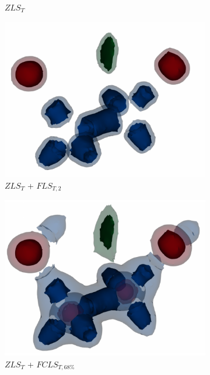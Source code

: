 \begin{figure}[t]
\begin{subfigure}{0.495\linewidth}
\caption{$ZLS_{T}$}
\label{}
\end{subfigure}
\begin{subfigure}{0.495\linewidth}
\centering
\includegraphics[width=\linewidth]{Images/EthaneDiol/fls_2.pdf}
\caption{$ZLS_{T}$ + $FLS_{T,2}$}
\label{}
\end{subfigure}
\begin{subfigure}{0.495\linewidth}
\centering
\includegraphics[width=\linewidth]{Images/EthaneDiol/fcls_68.pdf}
\caption{$ZLS_{T}$ + $FCLS_{T,68\%}$}
\label{}
\end{subfigure}
\caption{}
\label{}
\end{figure}
